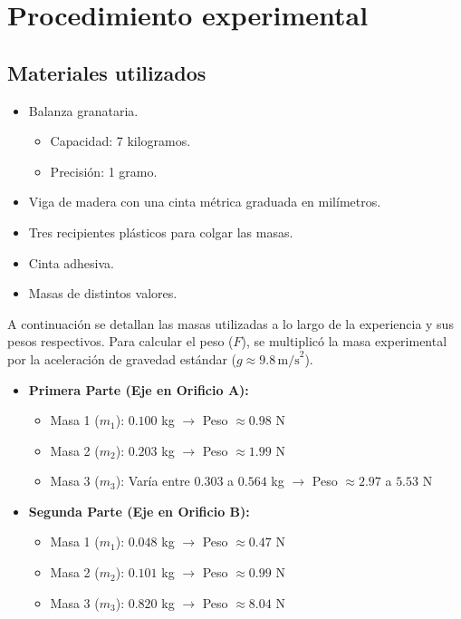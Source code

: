 \chapter{Procedimiento experimental}

\section{Materiales utilizados}
\begin{itemize}
    \item Balanza granataria.
    \begin{itemize}
        \item Capacidad: 7 kilogramos.
        \item Precisión: 1 gramo.
    \end{itemize}
    \item Viga de madera con una cinta métrica graduada en milímetros.
    \item Tres recipientes plásticos para colgar las masas.
    \item Cinta adhesiva.
    \item Masas de distintos valores.
\end{itemize}


A continuación se detallan las masas utilizadas a lo largo de la experiencia y sus pesos respectivos. Para calcular el peso ($F$), se multiplicó la masa experimental por la aceleración de gravedad estándar ($g \approx 9.8 \, \text{m/s}^2$).

\begin{itemize}
    \item \textbf{Primera Parte (Eje en Orificio A):}
    \begin{itemize}
        \item Masa 1 ($m_1$): $0.100$ kg $\rightarrow$ Peso $\approx 0.98$ N
        \item Masa 2 ($m_2$): $0.203$ kg $\rightarrow$ Peso $\approx 1.99$ N
        \item Masa 3 ($m_3$): Varía entre $0.303$ a $0.564$ kg $\rightarrow$ Peso $\approx 2.97$ a $5.53$ N
    \end{itemize}
    \vspace{0.2cm}
    \item \textbf{Segunda Parte (Eje en Orificio B):}
    \begin{itemize}
        \item Masa 1 ($m_1$): $0.048$ kg $\rightarrow$ Peso $\approx 0.47$ N
        \item Masa 2 ($m_2$): $0.101$ kg $\rightarrow$ Peso $\approx 0.99$ N
        \item Masa 3 ($m_3$): $0.820$ kg $\rightarrow$ Peso $\approx 8.04$ N
    \end{itemize}
\end{itemize}

